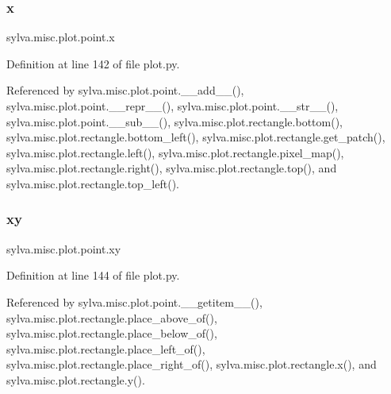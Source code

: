 \subsubsection{\texorpdfstring{x}{x}}
{\footnotesize\ttfamily sylva.\+misc.\+plot.\+point.\+x}



Definition at line 142 of file plot.\+py.



Referenced by sylva.\+misc.\+plot.\+point.\+\_\+\+\_\+add\+\_\+\+\_\+(), sylva.\+misc.\+plot.\+point.\+\_\+\+\_\+repr\+\_\+\+\_\+(), sylva.\+misc.\+plot.\+point.\+\_\+\+\_\+str\+\_\+\+\_\+(), sylva.\+misc.\+plot.\+point.\+\_\+\+\_\+sub\+\_\+\+\_\+(), sylva.\+misc.\+plot.\+rectangle.\+bottom(), sylva.\+misc.\+plot.\+rectangle.\+bottom\+\_\+left(), sylva.\+misc.\+plot.\+rectangle.\+get\+\_\+patch(), sylva.\+misc.\+plot.\+rectangle.\+left(), sylva.\+misc.\+plot.\+rectangle.\+pixel\+\_\+map(), sylva.\+misc.\+plot.\+rectangle.\+right(), sylva.\+misc.\+plot.\+rectangle.\+top(), and sylva.\+misc.\+plot.\+rectangle.\+top\+\_\+left().

\mbox{\label{classsylva_1_1misc_1_1plot_1_1point_a0343c9245053942c8de7e013a9c7d450}} 
\subsubsection{\texorpdfstring{xy}{xy}}
{\footnotesize\ttfamily sylva.\+misc.\+plot.\+point.\+xy}



Definition at line 144 of file plot.\+py.



Referenced by sylva.\+misc.\+plot.\+point.\+\_\+\+\_\+getitem\+\_\+\+\_\+(), sylva.\+misc.\+plot.\+rectangle.\+place\+\_\+above\+\_\+of(), sylva.\+misc.\+plot.\+rectangle.\+place\+\_\+below\+\_\+of(), sylva.\+misc.\+plot.\+rectangle.\+place\+\_\+left\+\_\+of(), sylva.\+misc.\+plot.\+rectangle.\+place\+\_\+right\+\_\+of(), sylva.\+misc.\+plot.\+rectangle.\+x(), and sylva.\+misc.\+plot.\+rectangle.\+y().

\mbox{\label{classsylva_1_1misc_1_1plot_1_1point_ac2bc4268769be52f4443f74b619cd781}} 
